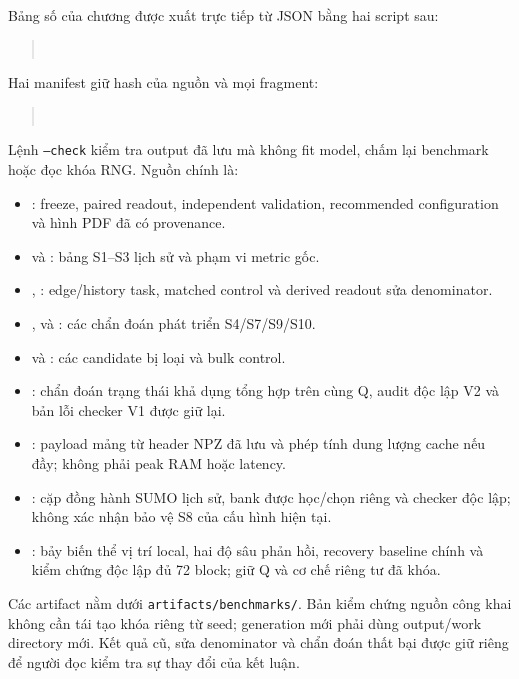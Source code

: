 Bảng số của chương được xuất trực tiếp từ JSON bằng hai script sau:
\begin{quote}\small
{}\\
\end{quote}
Hai manifest giữ hash của nguồn và mọi fragment:
\begin{quote}\small
{}\\
\end{quote}
Lệnh \texttt{--check} kiểm tra output đã lưu mà không
fit model, chấm lại benchmark hoặc đọc khóa RNG. Nguồn chính là:
\begin{itemize}
\setlength{\itemsep}{0pt}
  \item {}:
  freeze, paired readout, independent validation, recommended configuration
  và hình PDF đã có provenance.
  \item {} và :
  bảng S1--S3 lịch sử và phạm vi metric gốc.
  \item {},
  :
  edge/history task, matched control và derived readout sửa denominator.
  \item {},
   và
  :
  các chẩn đoán phát triển S4/S7/S9/S10.
  \item {} và
  :
  các candidate bị loại và bulk control.
  \item {}:
  chẩn đoán trạng thái khả dụng tổng hợp trên cùng Q, audit độc lập V2 và
  bản lỗi checker V1 được giữ lại.
  \item {}:
  payload mảng từ header NPZ đã lưu và phép tính dung lượng cache nếu đầy;
  không phải peak RAM hoặc latency.
  \item {}:
  cặp đồng hành SUMO lịch sử, bank được học/chọn riêng và checker độc lập;
  không xác nhận bảo vệ S8 của cấu hình hiện tại.
  \item {}:
  bảy biến thể vị trí local, hai độ sâu phản hồi, recovery baseline chính
  và kiểm chứng độc lập đủ 72 block; giữ Q và cơ chế riêng tư đã khóa.
\end{itemize}
Các artifact nằm dưới \texttt{artifacts/benchmarks/}. Bản kiểm chứng nguồn
công khai không cần tái tạo khóa riêng từ seed; generation mới phải dùng
output/work directory mới. Kết quả cũ, sửa denominator và chẩn đoán thất bại
được giữ riêng để người đọc kiểm tra sự thay đổi của kết luận.
\par\endgroup
